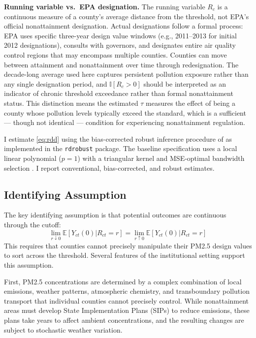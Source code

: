 \documentclass[12pt]{article}
\newcommand{\E}{\mathbb{E}}
\newcommand{\ind}{\mathbb{I}}
\begin{document}
\textbf{Running variable vs.\ EPA designation.} The running variable $R_c$ is a continuous measure of a county's average distance from the threshold, not EPA's official nonattainment designation. Actual designations follow a formal process: EPA uses specific three-year design value windows (e.g., 2011--2013 for initial 2012 designations), consults with governors, and designates entire air quality control regions that may encompass multiple counties. Counties can move between attainment and nonattainment over time through redesignation. The decade-long average used here captures persistent pollution exposure rather than any single designation period, and $\ind[R_c > 0]$ should be interpreted as an indicator of chronic threshold exceedance rather than formal nonattainment status. This distinction means the estimated $\tau$ measures the effect of being a county whose pollution levels typically exceed the standard, which is a sufficient --- though not identical --- condition for experiencing nonattainment regulation.

I estimate \eqref{eq:rdd} using the bias-corrected robust inference procedure of \citet{calonico2014robust} as implemented in the \texttt{rdrobust} package. The baseline specification uses a local linear polynomial ($p=1$) with a triangular kernel and MSE-optimal bandwidth selection \citep{calonico2020optimal}. I report conventional, bias-corrected, and robust estimates.

\subsection{Identifying Assumption}

The key identifying assumption is that potential outcomes are continuous through the cutoff:
\begin{equation}
\lim_{r \downarrow 0} \E[Y_{ct}(0) | R_{ct} = r] = \lim_{r \uparrow 0} \E[Y_{ct}(0) | R_{ct} = r]
\end{equation}
This requires that counties cannot precisely manipulate their PM2.5 design values to sort across the threshold. Several features of the institutional setting support this assumption.

First, PM2.5 concentrations are determined by a complex combination of local emissions, weather patterns, atmospheric chemistry, and transboundary pollution transport that individual counties cannot precisely control. While nonattainment areas must develop State Implementation Plans (SIPs) to reduce emissions, these plans take years to affect ambient concentrations, and the resulting changes are subject to stochastic weather variation.
\end{document}
